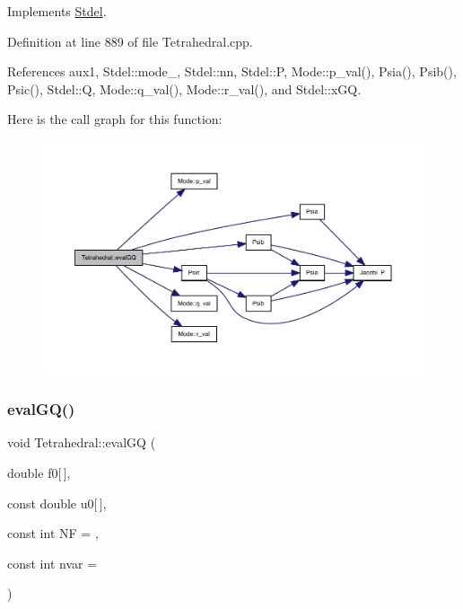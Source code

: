 Implements \hyperlink{classStdel_aac725224c4c3433228ca6841fe7aba49}{Stdel}.



Definition at line 889 of file Tetrahedral.\+cpp.



References aux1, Stdel\+::mode\+\_\+, Stdel\+::nn, Stdel\+::P, Mode\+::p\+\_\+val(), Psia(), Psib(), Psic(), Stdel\+::Q, Mode\+::q\+\_\+val(), Mode\+::r\+\_\+val(), and Stdel\+::x\+GQ.

Here is the call graph for this function\+:
\nopagebreak
\begin{figure}[H]
\begin{center}
\leavevmode
\includegraphics[width=350pt]{classTetrahedral_aa32a1da52c137fd89f72af9bbfbf1524_cgraph}
\end{center}
\end{figure}
\mbox{\label{classTetrahedral_a2ffab801c153c3077ec7aec73d80b7bf}} 
\subsubsection{\texorpdfstring{eval\+G\+Q()}{evalGQ()}\hspace{0.1cm}{\footnotesize\ttfamily [2/2]}}
{\footnotesize\ttfamily void Tetrahedral\+::eval\+GQ (\begin{DoxyParamCaption}\item[{double}]{f0\mbox{[}$\,$\mbox{]},  }\item[{const double}]{u0\mbox{[}$\,$\mbox{]},  }\item[{const int}]{NF = {},  }\item[{const int}]{nvar = {} }\end{DoxyParamCaption})\hspace{0.3cm}{\ttfamily [virtual]}}



